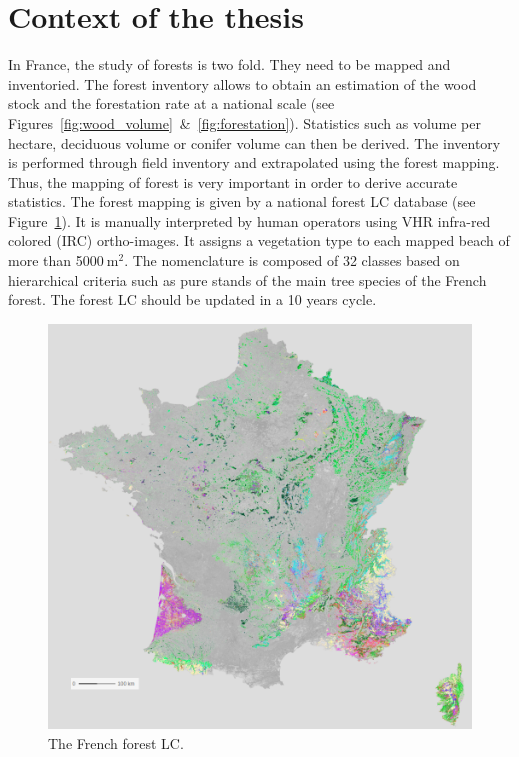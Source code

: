 \section{Context of the thesis}
In France, the study of forests is two fold. They need to be mapped and inventoried. The forest inventory allows to obtain an estimation of the wood stock and the forestation rate at a national scale (see Figures~\ref{fig:wood_volume}~\&~\ref{fig:forestation}). Statistics such as volume per hectare, deciduous volume or conifer volume can then be derived. The inventory is performed through field inventory and extrapolated using the forest mapping. Thus, the mapping of forest is very important in order to derive accurate statistics.	
The forest mapping is given by a national forest LC database (see Figure~\ref{fig:FLC}). It is manually interpreted by human operators using VHR infra-red colored (IRC) ortho-images. It assigns a vegetation type to each mapped beach of more than 5000$\:$m$^{2}$. The nomenclature is composed of 32 classes based on hierarchical criteria such as pure stands of the main tree species of the French forest. The forest LC should be updated in a 10 years cycle.

\begin{figure}[htbp]
\begin{center}
\includegraphics[width=\textwidth]{Figures/BD_foret_France}
\end{center}
\caption{The French forest LC.}
\label{fig:FLC}
\end{figure}


